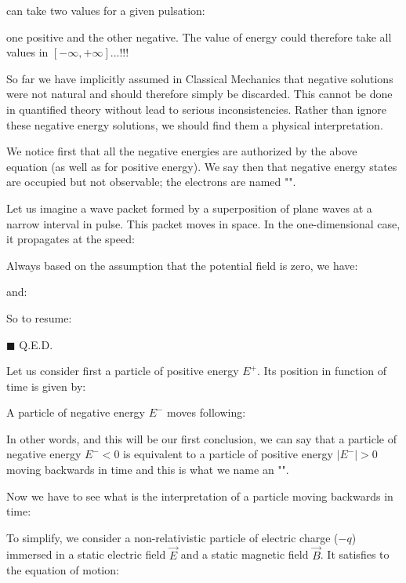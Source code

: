 	can take two values for a given pulsation:
	
	one positive and the other negative. The value of energy could therefore take all values in $[-\infty,+\infty]$...!!!
	
	So far we have implicitly assumed in Classical Mechanics that negative solutions were not natural and should therefore simply be discarded. This cannot be done in quantified theory without lead to serious inconsistencies. Rather than ignore these negative energy solutions, we should find them a physical interpretation.
	
	We notice first that all the negative energies are authorized by the above equation (as well as for positive energy). We say then that negative energy states are occupied but not observable; the electrons are named "".
	   	\begin{theorem}
	Let us imagine a wave packet formed by a superposition of plane waves at a narrow interval in pulse. This packet moves in space. In the one-dimensional case, it propagates at the speed:
	
	\end{theorem}
	\begin{dem}
	Always based on the assumption that the potential field is zero, we have:
	
	and:
	
	So to resume:
	
	\begin{flushright}
		$\blacksquare$  Q.E.D.
	\end{flushright}
	\end{dem}
	Let us consider first a particle of positive energy $E^+$. Its position in function of time is given by:
	
	A particle of negative energy $E^-$ moves following:
	
	In other words, and this will be our first conclusion, we can say that a particle of negative energy $E^-<0$ is equivalent to a particle of positive energy $|E^-|>0$ moving backwards in time and this is what we name an "".
	
	Now we have to see what is the interpretation of a particle moving backwards in time:
	
	To simplify, we consider a non-relativistic particle of electric charge ($-q$) immersed in a static electric field $\vec{E}$ and a static magnetic field $\vec{B}$. It satisfies to the equation of motion:
	
